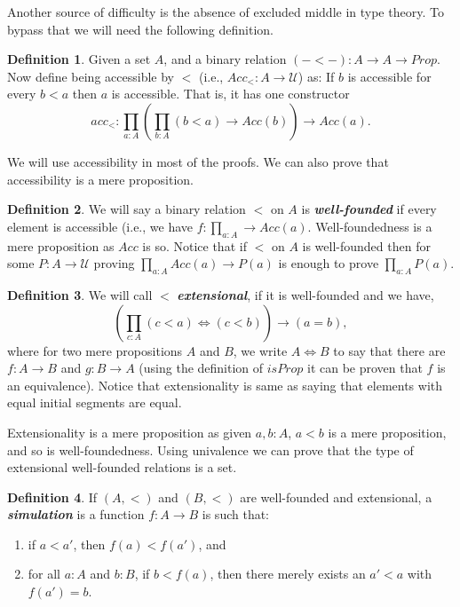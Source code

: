 \documentclass[10pt]{article}
\theoremstyle{definition}
\newtheorem{definition}{Definition}[section]
\theoremstyle{plain}
\theoremstyle{remark}
\newcommand{\U}{\mathscr{U}}
\begin{document}
Another source of difficulty is the absence of excluded middle in type theory. To bypass that
we will need the following definition. 

\begin{definition}\label{D:Acc}
Given a set $A$, and a binary relation $(-<-) : A \to A \to Prop$. Now define being 
accessible by $<$ (i.e., ${Acc}_{<} : A \to \U$) as: If $b$ is accessible for every $b<a$ 
then $a$ is accessible. That is, it has one constructor 
\[ {acc}_< : \prod_{a : A} \left( \prod_{b : A} (b<a) \to {Acc}(b) \right) 
\to {Acc}(a). \]

\end{definition}
We will use accessibility in most of the proofs. We can also prove that accessibility is a 
mere proposition. 

\begin{definition}\label{D:WF}
We will say a binary relation $<$ on $A$ is \textbf{\textit{well-founded}} if every element
is accessible (i.e., we have $f : \prod_{a : A} \to Acc(a)$. Well-foundedness is a mere 
proposition as ${Acc}$ is so. Notice that if $<$ on $A$ is well-founded then for some 
$P : A \to \U$ proving $\prod_{a:A} Acc(a) \to P(a)$ is enough to prove $\prod_{a : A} P(a)$.
\end{definition}

\begin{definition}\label{D:Ext}
We will call $<$ \textbf{\textit{extensional}}, if it is well-founded and we have,
\[ \left( \prod_{c : A}  (c<a) \iff (c<b) \right) \to (a = b),\]
where for two mere propositions $A$ and $B$, we write $A\iff B$ to say that there are 
$f : A \to B$ and $g : B \to A$ (using the definition of ${isProp}$ it can be proven 
that $f$ is an equivalence). Notice that extensionality is same as saying that elements 
with equal initial segments are equal.
\end{definition} 

Extensionality is a mere proposition as given $a,b:A$, $a<b$ is a mere proposition, and so
is well-foundedness. Using univalence we can prove that the type of extensional well-founded
relations is a set.

\begin{definition}\label{D:sim}
If $(A,<)$ and $(B,<)$ are well-founded and extensional, a \textbf{\textit{simulation}} is
a function $f : A \to B$ is such that:
\begin{enumerate}
\item if $a < a'$, then $f(a) < f(a')$, and
\item for all $a : A$ and $b : B$, if $b < f(a)$, then there merely exists an $a' < a$ with
      $f(a') = b$.
\end{enumerate}
\end{definition} 
\end{document}
